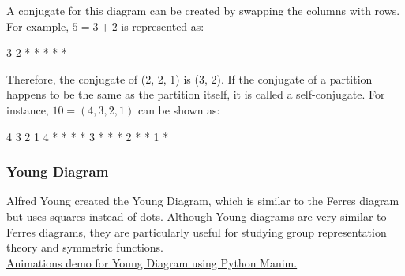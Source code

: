 \documentclass{article}
\theoremstyle{definition}
\theoremstyle{question}
\begin{document}
\noindent A conjugate for this diagram can be created by swapping the columns with rows. For example, \(5=3+2\) is represented as:

\begin{center}
\begin{verbbox}
3 2
* *
* *
*
\\
\end{verbbox}
\theverbbox
\end{center}
\noindent Therefore, the conjugate of (2, 2, 1) is (3, 2).
\newline
\newline
If the conjugate of a partition happens to be the same as the partition itself, it is called a self-conjugate. For instance, \(10=(4, 3, 2, 1)\) can be shown as:
\begin{center}
\begin{verbbox}
  4 3 2 1
4 * * * *
3 * * * 
2 * *
1 *
\\
\end{verbbox}
\theverbbox
\end{center}

\subsubsection{Young Diagram}
Alfred Young created the Young Diagram, which is similar to the Ferres diagram but uses squares instead of dots. Although Young diagrams are very similar to Ferres diagrams, they are particularly useful for studying group representation theory and symmetric functions. \\

\noindent \href{https://youtu.be/8qc71j8yhG0}{Animations demo for Young Diagram using Python Manim.}\cite{manim}


\begin{figure}[h]
\centering
{}
\end{figure}
\end{document}
